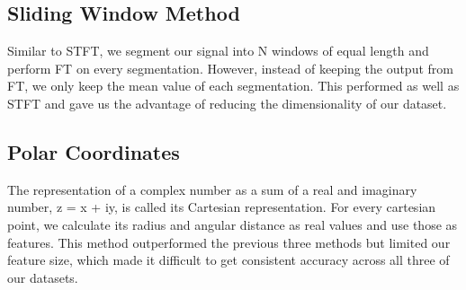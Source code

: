 \documentclass{turabian-thesis}
\begin{document}








\subsection{Sliding Window Method}

Similar to STFT, we segment our signal into N windows of equal length and perform FT on every segmentation. However, instead of keeping the output from FT, we only keep the mean value of each segmentation. This performed as well as STFT and gave us the advantage of reducing the dimensionality of our dataset. 

\subsection{Polar Coordinates}

The representation of a complex number as a sum of a real and imaginary number, z = x + iy, is called its Cartesian representation. For every cartesian point, we calculate its radius and angular distance as real values and use those as features. This method outperformed the previous three methods but limited our feature size, which made it difficult to get consistent accuracy across all three of our datasets.
\end{document}
